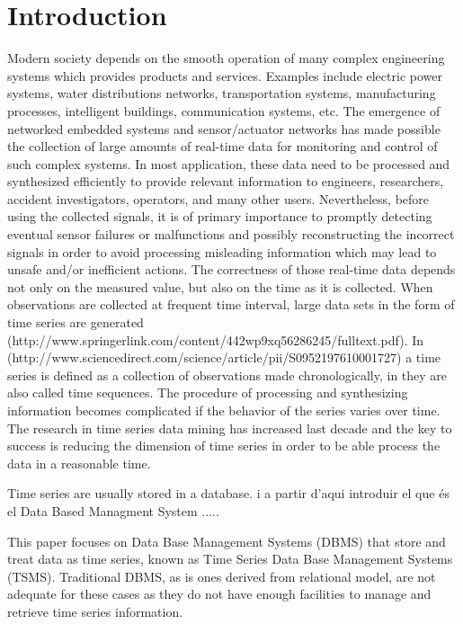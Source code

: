 \section{Introduction}



Modern society depends on the smooth operation of many complex
engineering systems which provides products and services. Examples
include electric power systems, water distributions networks,
transportation systems, manufacturing processes, intelligent
buildings, communication systems, etc. The emergence of networked
embedded systems and sensor/actuator networks has made possible the
collection of large amounts of real-time data for monitoring and
control of such complex systems.  In most application, these data need
to be processed and synthesized efficiently to provide relevant
information to engineers, researchers, accident investigators,
operators, and many other users. Nevertheless, before using the
collected signals, it is of primary importance to promptly detecting
eventual sensor failures or malfunctions and possibly reconstructing
the incorrect signals in order to avoid processing misleading
information which may lead to unsafe and/or inefficient actions. The
correctness of those real-time data depends not only on the measured
value, but also on the time as it is collected. When observations are
collected at frequent time interval, large data sets in the form of
time series are generated
(http://www.springerlink.com/content/442wp9xq56286245/fulltext.pdf). In
(http://www.sciencedirect.com/science/article/pii/S0952197610001727) a
time series is defined as a collection of observations made
chronologically, in \cite{last:hetland} they are also called time
sequences.  The procedure of processing and synthesizing information
becomes complicated if the behavior of the series varies over time.
The research in time series data mining has increased last decade and
the key to success is reducing the dimension of time series in order
to be able process the data in a reasonable time.

Time series are usually stored in a database.     i a partir d'aqui introduir el que és el Data Based Managment System .....






This paper focuses on Data Base Management Systems (DBMS) that store
and treat data as time series, known as Time Series Data Base
Management Systems (TSMS). Traditional DBMS, as is ones derived from
relational model, are not adequate for these cases as they do not have
enough facilities to manage and retrieve time series information.

